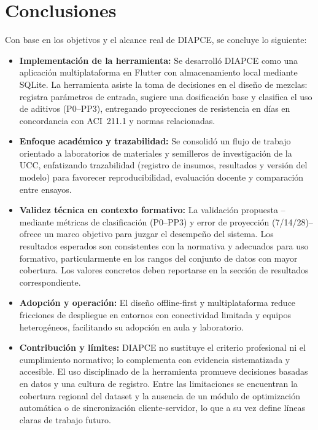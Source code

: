 \documentclass[12pt, letterpaper]{article}
\begin{document}
\section{Conclusiones}

Con base en los objetivos y el alcance real de DIAPCE, se concluye lo siguiente:

\begin{itemize}
  \item \textbf{Implementación de la herramienta:} Se desarrolló DIAPCE como una aplicación multiplataforma en Flutter con almacenamiento local mediante SQLite. La herramienta asiste la toma de decisiones en el diseño de mezclas: registra parámetros de entrada, sugiere una dosificación base y clasifica el uso de aditivos (P0--PP3), entregando proyecciones de resistencia en días en concordancia con ACI~211.1 y normas relacionadas.
  \item \textbf{Enfoque académico y trazabilidad:} Se consolidó un flujo de trabajo orientado a laboratorios de materiales y semilleros de investigación de la UCC, enfatizando trazabilidad (registro de insumos, resultados y versión del modelo) para favorecer reproducibilidad, evaluación docente y comparación entre ensayos.
  \item \textbf{Validez técnica en contexto formativo:} La validación propuesta --mediante métricas de clasificación (P0--PP3) y error de proyección (7/14/28)-- ofrece un marco objetivo para juzgar el desempeño del sistema. Los resultados esperados son consistentes con la normativa y adecuados para uso formativo, particularmente en los rangos del conjunto de datos con mayor cobertura. Los valores concretos deben reportarse en la sección de resultados correspondiente.
  \item \textbf{Adopción y operación:} El diseño offline-first y multiplataforma reduce fricciones de despliegue en entornos con conectividad limitada y equipos heterogéneos, facilitando su adopción en aula y laboratorio.
  \item \textbf{Contribución y límites:} DIAPCE no sustituye el criterio profesional ni el cumplimiento normativo; lo complementa con evidencia sistematizada y accesible. El uso disciplinado de la herramienta promueve decisiones basadas en datos y una cultura de registro. Entre las limitaciones se encuentran la cobertura regional del dataset y la ausencia de un módulo de optimización automática o de sincronización cliente-servidor, lo que a su vez define líneas claras de trabajo futuro.
\end{itemize}
    
\end{document}
